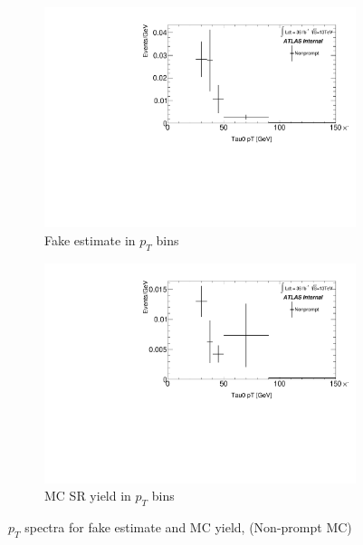 \documentclass[11pt]{article}
\begin{document}
	\begin{figure}[H]
	\centering
	\begin{subfigure}{.5\textwidth}
	\centering
	\includegraphics[width=0.95\linewidth]{figures/FakesEstimate_data_pp8_nonallhad_new_scaledHists/hist_FakeEstimate_Nonprompt.pdf}
  	\caption{Fake estimate in $p_T$ bins}
  	\label{fig:sub1}
	\end{subfigure}%
	\begin{subfigure}{.5\textwidth}
	\centering
	\includegraphics[width=0.95\linewidth]{figures/FakesEstimate_data_pp8_nonallhad_new_scaledHists/hist_SRMC_Nonprompt.pdf}
	\caption{MC SR yield in $p_T$ bins}
	\end{subfigure}
	\caption{$p_T$ spectra for fake estimate and MC yield, (Non-prompt MC)}
	\end{figure}
\end{document}
